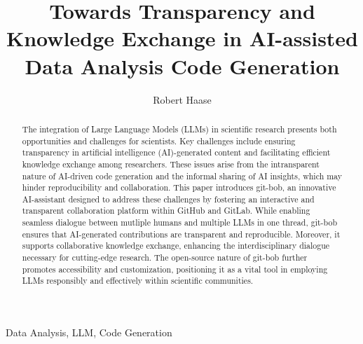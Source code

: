 \documentclass[times, twoside]{zHenriquesLab-StyleBioRxiv}
\begin{document}
\title{Towards Transparency and Knowledge Exchange in AI-assisted Data Analysis Code Generation}

\author[1,2,3,\Letter]{Robert Haase}


\maketitle

\begin{abstract}

The integration of Large Language Models (LLMs) in scientific research presents both opportunities and challenges for scientists. Key challenges include ensuring transparency in artificial intelligence (AI)-generated content and facilitating efficient knowledge exchange among researchers. These issues arise from the intransparent nature of AI-driven code generation and the informal sharing of AI insights, which may hinder reproducibility and collaboration. This paper introduces git-bob, an innovative AI-assistant designed to address these challenges by fostering an interactive and transparent collaboration platform within GitHub and GitLab. While enabling seamless dialogue between mutliple humans and multiple LLMs in one thread, git-bob ensures that AI-generated contributions are transparent and reproducible. Moreover, it supports collaborative knowledge exchange, enhancing the interdisciplinary dialogue necessary for cutting-edge research. The open-source nature of git-bob further promotes accessibility and customization, positioning it as a vital tool in employing LLMs responsibly and effectively within scientific communities.

\end {abstract}

\begin{keywords}
Data Analysis, LLM, Code Generation
\end{keywords}
\end{document}
